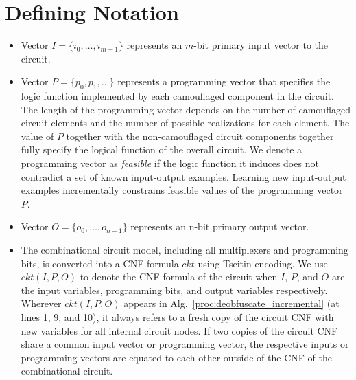 \documentclass[proposal]{umassthesis}  %
\begin{document}
\section{Defining Notation}
\begin{itemize}

\item Vector $I=\{i_0,\dots, i_{m-1}\}$ represents an $m$-bit primary input vector to the circuit.%

\item Vector $P=\{  p_{0}, p_{1}, \dots \}$ represents a programming vector that specifies the logic function implemented by each camouflaged component in the circuit. The length of the programming vector depends on the number of camouflaged circuit elements and the number of possible realizations for each element. The value of $P$ together with the non-camouflaged circuit components together fully specify the logical function of the overall circuit. We denote a programming vector as \textit{feasible} if the logic function it induces does not contradict a set of known input-output examples. Learning new input-output examples incrementally constrains feasible values of the programming vector $P$.

\item Vector $O=\{o_0,\dots,o_{n-1}\}$ represents an n-bit primary output vector. %

\item The combinational circuit model, including all multiplexers and programming bits, is converted into a CNF formula $ckt$ using Tseitin encoding. We use $ckt(I,P,O)$ to denote the CNF formula of the circuit when $I$, $P$, and $O$ are the input variables, programming bits, and output variables respectively. Wherever $ckt(I,P,O)$ appears in Alg.~\ref{proc:deobfuscate_incremental} (at lines 1, 9, and 10), it always refers to a fresh copy of the circuit CNF with new variables for all internal circuit nodes. If two copies of the circuit CNF share a common input vector or programming vector, the respective inputs or programming vectors are equated to each other outside of the CNF of the combinational circuit. %


\end{itemize}
\end{document}
